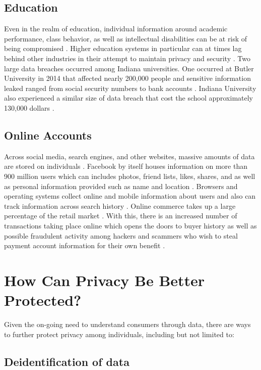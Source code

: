 \documentclass[sigconf]{acmart}
\begin{document}
  \subsection{Education} 

Even in the realm of education, individual information around academic performance, class behavior, as well as intellectual disabilities can be at risk of being compromised \cite{Bathon2013}. Higher education systems in particular can at times lag behind other industries in their attempt to maintain privacy and security \cite{Daniel2015}. Two large data breaches occurred among Indiana universities. One occurred at Butler University in 2014 that affected nearly 200,000 people and sensitive information leaked ranged from social security numbers to bank accounts \cite{McCarthy2015}. Indiana University also experienced a similar size of data breach that cost the school approximately 130,000 dollars \cite{McCarthy2015}. 

  \subsection{Online Accounts} 

Across social media, search engines, and other websites, massive amounts of data are stored on individuals \cite{Tene2013}. Facebook by itself houses information on more than 900 million users which can includes photos, friend lists, likes, shares, and as well as personal information provided such as name and location \cite{Tene2013}. Browsers and operating systems collect online and mobile information about users and also can track information across search history \cite{Tene2013}. Online commerce takes up a large percentage of the retail market \cite{Tene2013}. With this, there is an increased number of transactions taking place online which opens the doors to buyer history as well as possible fraudulent activity among hackers and scammers who wish to steal payment account information for their own benefit \cite{Tene2013}. 

\section{How Can Privacy Be Better Protected?}

Given the on-going need to understand consumers through data, there are ways to further protect privacy among individuals, including but not limited to:

 \subsection{Deidentification of data} 
\end{document}
